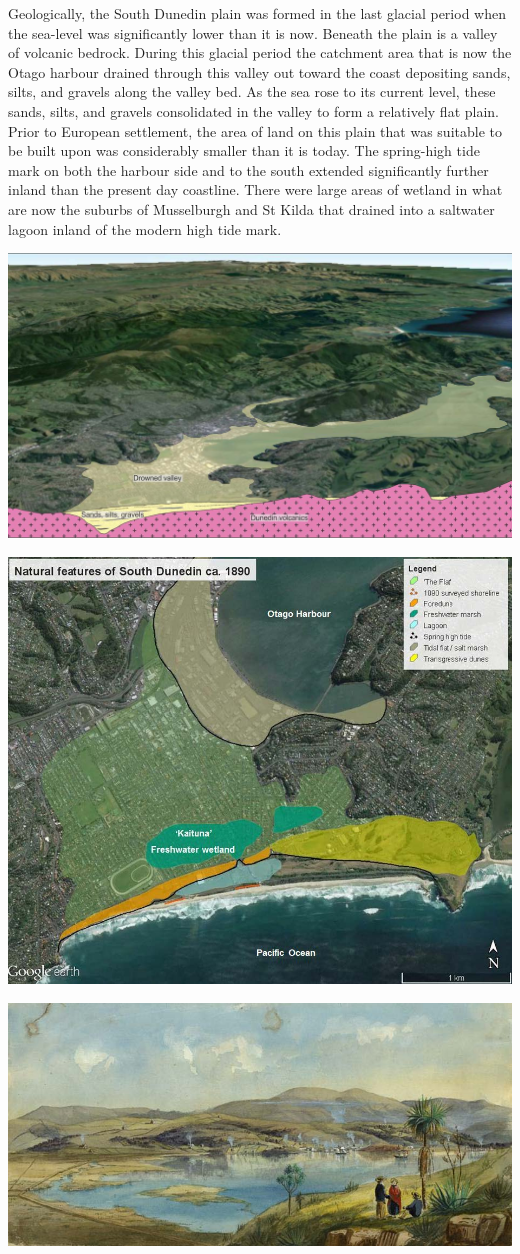 \documentclass[]{article}
\begin{document}
Geologically, the South Dunedin plain was formed in the last glacial
period when the sea-level was significantly lower than it is now.
Beneath the plain is a valley of volcanic bedrock. During this glacial
period the catchment area that is now the Otago harbour drained through
this valley out toward the coast depositing sands, silts, and gravels
along the valley bed. As the sea rose to its current level, these sands,
silts, and gravels consolidated in the valley to form a relatively flat
plain. Prior to European settlement, the area of land on this plain that
was suitable to be built upon was considerably smaller than it is today.
The spring-high tide mark on both the harbour side and to the south
extended significantly further inland than the present day coastline.
There were large areas of wetland in what are now the suburbs of
Musselburgh and St Kilda that drained into a saltwater lagoon inland of
the modern high tide mark.

\begin{center}\includegraphics[width=0.5\linewidth]{../images/sd_historical_1} \end{center}

\begin{center}\includegraphics[width=0.5\linewidth]{../images/sd_historical_2} \end{center}

\begin{center}\includegraphics[width=0.5\linewidth]{../images/sd_historical_3} \end{center}
\end{document}
